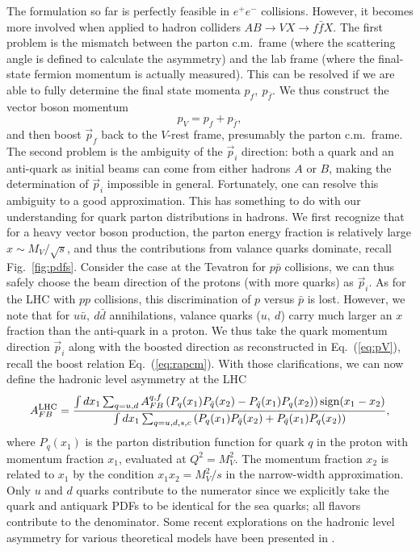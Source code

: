 \documentclass[prd,aps,floats,preprintnumbers,preprint,superscriptaddress,floatfix,nofootinbib]{revtex4}
\def\epem{e^+e^-}
\def\be{\begin{equation}}
\def\ee{\end{equation}}
\begin{document}
The formulation so far is perfectly feasible in $\epem$ collisions. However,
it becomes more involved when applied to hadron colliders
$AB \to V X \to f \bar f X.$ The first problem
is  the mismatch between the parton c.m.~frame (where the scattering angle
is defined to calculate the asymmetry) 
and the lab frame (where the final-state fermion momentum is actually 
measured). This can be resolved if we are able to fully determine the final
state momenta $p_f,\ p_{\bar f}$.
We thus construct the vector boson momentum 
\be
p^{}_V = p_f + p_{\bar f}, 
\label{eq:pV}
\ee
and then boost $\vec p_f$ back to the $V$-rest frame, presumably the parton
c.m.~frame.
The second problem is the ambiguity of the $\vec p_i$ direction: both a quark 
and an anti-quark  as initial beams 
can come from either hadrons $A$ or $B$, making the 
determination of $\vec p_i$ impossible in general. Fortunately, one can
resolve this ambiguity to a good approximation. This has something to do
with our understanding for quark parton distributions in hadrons. We  first
recognize that for a heavy vector boson production, the parton energy
fraction is relatively large $x\sim M_V/\sqrt s$, and thus the contributions 
from valance quarks dominate, recall Fig.~\ref{fig:pdfs}. 
Consider the case at the Tevatron for $p \bar p$ collisions, 
we can thus safely choose the beam direction of the protons (with more 
quarks) as $\vec p_i$.
As for the LHC with $pp$ collisions, this discrimination of $p$ versus $\bar p$
is lost. However, we note that for $u\bar u,\ d\bar d$ annihilations, valance
quarks ($u,\ d$) carry much larger an $x$ fraction than the anti-quark in a proton.
We thus take the quark momentum direction $\vec p_i$ along with the
boosted direction as reconstructed in Eq.~(\ref{eq:pV}), 
recall the boost relation Eq.~(\ref{eq:rapcm}). With those clarifications, 
we can now define the hadronic level asymmetry at the LHC \cite{Rosner}
\begin{equation}
	A_{FB}^{\rm LHC} = 
	\frac{ \int dx_1 \sum_{q=u,d} A_{FB}^{q,f} 
	\left( P_q(x_1)P_{\bar q}(x_2) - P_{\bar q}(x_1)P_q(x_2) \right) 
	{\rm sign}(x_1-x_2)}
	{ \int dx_1 \sum_{q=u,d,s,c} 
	\left(P_q(x_1)P_{\bar q}(x_2) + P_{\bar q}(x_1)P_q(x_2) \right) },
	\label{eq:Afbcalc}
\end{equation}
where $P_q(x_1)$ is the parton distribution function for quark $q$ in the 
proton with momentum fraction $x_1$, evaluated at $Q^2 = M_V^2$.
The momentum fraction $x_2$ is related to $x_1$ by the condition 
$x_1x_2 = M_V^2/s$ in the narrow-width approximation.
Only $u$ and $d$ quarks contribute to the numerator since we explicitly 
take the quark and antiquark PDFs to be identical for the sea quarks;
all flavors contribute to the denominator. Some recent explorations on
the hadronic level asymmetry for various theoretical models 
have been presented in \cite{smoking}.
\end{document}
